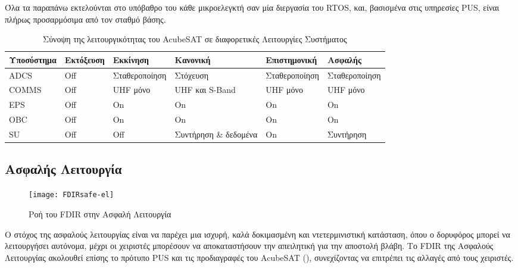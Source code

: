 \documentclass[a4paper,nobib]{tufte-book}
\begin{document}
Όλα τα παραπάνω εκτελούνται στο υπόβαθρο του κάθε μικροελεγκτή σαν μία διεργασία του \acs{RTOS}, και, βασισμένα στις υπηρεσίες \acs{PUS}, είναι πλήρως προσαρμόσιμα από τον σταθμό βάσης.

\begin{table}[h]
	\centering
	\caption{Σύνοψη της λειτουργικότητας του AcubeSAT σε διαφορετικές Λειτουργίες Συστήματος}
	\label{tab:acubesatmodes}
	\begin{tabular}{@{}llllll@{}}
		\toprule
		Υποσύστημα    & Εκτόξευση & Εκκίνηση & Κανονική                 & Επιστημονική        & Ασφαλής             \\ \midrule
		\acs{ADCS}  & \color{off} Off    & Σταθεροποίηση     & \color{on} Στόχευση                & Σταθεροποίηση     & Σταθεροποίηση       \\
		\acs{COMMS} & \color{off} Off    & \acs{UHF} μόνο & \color{on} \acs{UHF} και S-Band    & \acs{UHF} μόνο & \acs{UHF} μόνο   \\
		\acs{EPS}   & \color{off} Off    & \color{on} On             & \color{on} On                      & \color{on} On             & \color{on} On               \\
		\acs{OBC}   & \color{off} Off    & \color{on} On             & \color{on} On                      & \color{on} On             & \color{on} On               \\
		\acs{SU}    & \color{off} Off    & \color{off} Off            & Συντήρηση \& δεδομένα & \color{on} On             & Συντήρηση \\ \bottomrule
	\end{tabular}
	\vspace{1em}
\end{table}

\subsection{Ασφαλής Λειτουργία}
\label{itm:safe_mode}

\begin{figure}[h]
	\texttt{[image: FDIRsafe-el]}
	\caption{Ροή του \acs{FDIR} στην Ασφαλή Λειτουργία}
	\label{fig:safeflow}
\end{figure}

Ο στόχος της ασφαλούς λειτουργίας είναι να παρέχει μια ισχυρή, καλά δοκιμασμένη και ντετερμινιστική κατάσταση, όπου ο δορυφόρος μπορεί να λειτουργήσει αυτόνομα, μέχρι οι χειριστές μπορέσουν να αποκαταστήσουν την απειλητική για την αποστολή βλάβη. Το \acs{FDIR} της Ασφαλούς Λειτουργίας ακολουθεί επίσης το πρότυπο \acs{PUS} και τις προδιαγραφές του AcubeSAT (), συνεχίζοντας να επιτρέπει τις αλλαγές από τους χειριστές.
\end{document}
